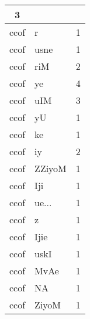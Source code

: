\documentclass[a4 paper]{article}
\begin{document}
\begin{longtable}{cp{}p{}}
3\\ \midrule ccof & r & 1\\ \midrule ccof & usne & 1\\ \midrule ccof & riM & 2\\ \midrule ccof & ye & 4\\ \midrule ccof & uIM & 3\\ \midrule ccof & yU & 1\\ \midrule ccof & ke & 1\\ \midrule ccof & iy & 2\\ \midrule ccof & ZZiyoM & 1\\ \midrule ccof & Iji & 1\\ \midrule ccof & ue... & 1\\ \midrule ccof & z & 1\\ \midrule ccof & Ijie & 1\\ \midrule ccof & uskI & 1\\ \midrule ccof & MvAe & 1\\ \midrule ccof & NA & 1\\ \midrule ccof & ZiyoM & 1\\ \midrule 

\end{longtable}
\end{document}
